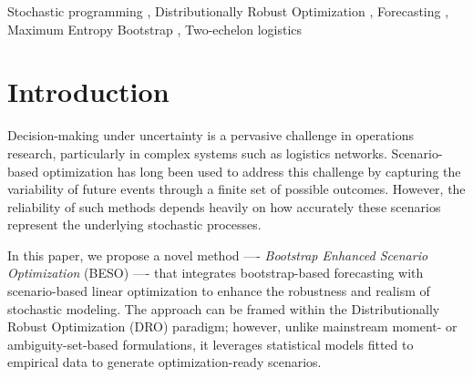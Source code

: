 \documentclass[review,a4paper,fleqn,3p,11pt,authoryear]{elsarticle}
\begin{document}

\begin{keyword}
	Stochastic programming \sep
	Distributionally Robust Optimization \sep
	Forecasting \sep
	Maximum Entropy Bootstrap \sep 
	Two-echelon logistics
\end{keyword}

\maketitle

\section{Introduction} \label{Sec:intro}

Decision-making under uncertainty is a pervasive challenge in operations research, particularly in complex systems such as logistics networks. Scenario-based optimization has long been used to address this challenge by capturing the variability of future events through a finite set of possible outcomes. However, the reliability of such methods depends heavily on how accurately these scenarios represent the underlying stochastic processes.

In this paper, we propose a novel method —- {\em Bootstrap Enhanced Scenario Optimization} (BESO) —- that integrates bootstrap-based forecasting with scenario-based linear optimization to enhance the robustness and realism of stochastic modeling. The approach can be framed within the Distributionally Robust Optimization (DRO) paradigm; however, unlike mainstream moment- or ambiguity-set-based formulations, it leverages statistical models fitted to empirical data to generate optimization-ready scenarios.
\end{document}
